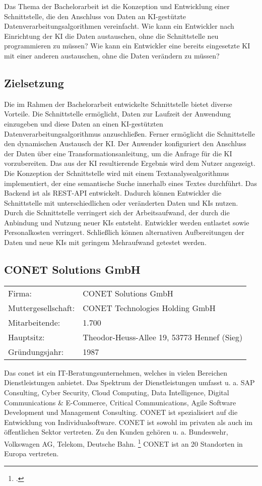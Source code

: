 Das Thema der Bachelorarbeit ist die Konzeption und Entwicklung einer Schnittstelle, die den Anschluss von Daten an KI-gestützte Datenverarbeitungsalgorithmen vereinfacht. Wie kann ein Entwickler nach Einrichtung der KI die Daten austauschen, ohne die Schnittstelle neu programmieren zu müssen? Wie kann ein Entwickler eine bereits eingesetzte KI mit einer anderen austauschen, ohne die Daten verändern zu müssen?

\subsection{Zielsetzung}
Die im Rahmen der Bachelorarbeit entwickelte Schnittstelle bietet diverse Vorteile. Die Schnittstelle ermöglicht, Daten zur Laufzeit der Anwendung einzugeben und diese Daten an einen KI-gestützten Datenverarbeitungsalgorithmus anzuschließen. Ferner ermöglicht die Schnittstelle den dynamischen Austausch der KI. Der Anwender konfiguriert den Anschluss der Daten über eine Transformationsanleitung, um die Anfrage für die KI vorzubereiten. Das aus der KI resultierende Ergebnis wird dem Nutzer angezeigt. Die Konzeption der Schnittstelle wird mit einem Textanalysealgorithmus implementiert, der eine semantische Suche innerhalb eines Textes durchführt. Das Backend ist als REST-API entwickelt. Dadurch können Entwickler die Schnittstelle mit unterschiedlichen oder veränderten Daten und KIs nutzen. Durch die Schnittstelle verringert sich der Arbeitsaufwand, der durch die Anbindung und Nutzung neuer KIs entsteht. Entwickler werden entlastet sowie Personalkosten verringert. 
Schließlich können alternativen Aufbereitungen der Daten und neue KIs mit geringem Mehraufwand getestet werden.

\subsection{CONET Solutions GmbH}
\begin{table}[H]
\begin{tabular}{ l l }
Firma: & CONET Solutions GmbH \\
Muttergesellschaft: & CONET Technologies Holding GmbH \\
Mitarbeitende: & 1.700 \\
Hauptsitz: & Theodor-Heuss-Allee 19, 53773 Hennef (Sieg) \\
Gründungsjahr: & 1987 
\end{tabular}
\end{table}

Das \ac{conet} ist ein IT-Beratungsunternehmen, welches in vielen Bereichen Dienstleistungen anbietet. Das Spektrum der Dienstleistungen umfasst u. a. SAP Consulting, Cyber Security, Cloud Computing, Data Intelligence, Digital Communications \& E-Commerce, Critical Communications, Agile Software Development und Management Consulting. CONET ist spezialisiert auf die Entwicklung von Individualsoftware. CONET ist sowohl im privaten als auch im öffentlichen Sektor vertreten. Zu den Kunden gehören u. a. Bundeswehr, Volkswagen AG, Telekom, Deutsche Bahn. \footcite [Auszug aus der Kundenliste]{Kunden} CONET ist an 20 Standorten in Europa vertreten.

